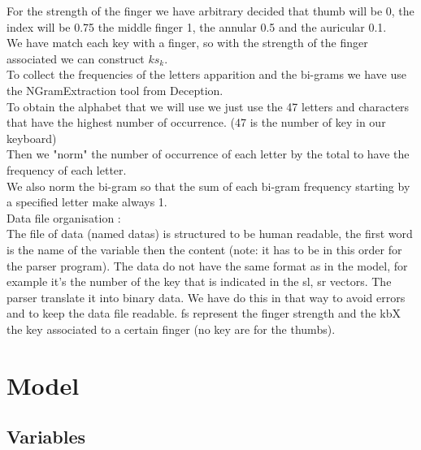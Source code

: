 \documentclass[a4paper,titlepage]{article}
\begin{document}
For the strength of the finger we have arbitrary decided that thumb will be 0,  the index will  be 0.75 the middle finger 1, the annular 0.5 and the auricular 0.1. \\

We have match each key with a finger, so with the strength of the finger associated we can construct $ks_{k}$. \\

To collect the frequencies of the letters apparition and the bi-grams we have use the NGramExtraction tool from Deception.\\
To obtain the alphabet that we will use we just use the 47 letters and characters that have the highest number of occurrence. (47 is the number of key in our keyboard)\\
Then we "norm" the number of occurrence of each letter by the total to have the frequency of each letter.\\
We also norm the bi-gram so that the sum of each bi-gram frequency starting by a specified letter make always 1.\\

Data file organisation : \\
The file of data (named datas) is structured to be human readable, the first word is the name of the variable then the content (note: it has to be in this order for the parser program).
The data do not have the same format as in the model, for example it's the number of the key that is indicated in the sl, sr vectors. The parser translate it into binary data. We have do this in that way to avoid errors and to keep the data file readable.
fs represent the finger strength and the kbX the key associated to a certain finger (no key are for the thumbs).






\section{Model}

	\subsection{Variables}
\end{document}

